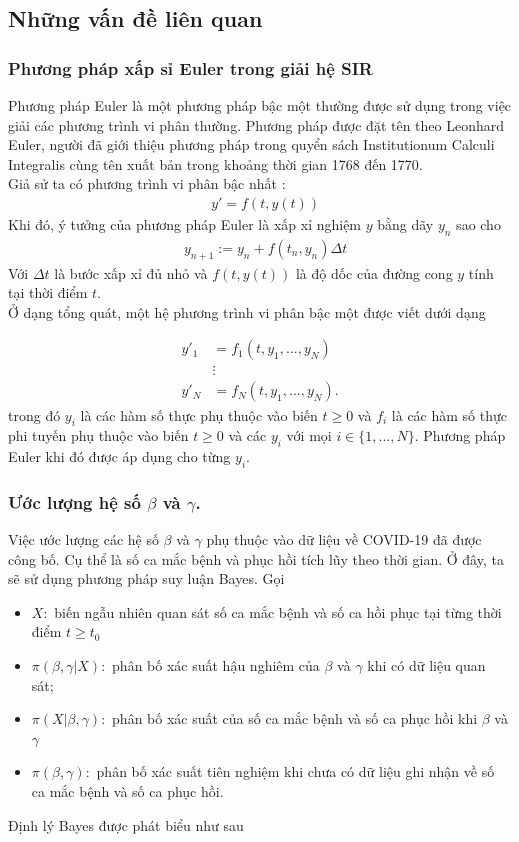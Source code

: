 \documentclass[a4paper]{article}
\begin{document}
\subsection{Những vấn đề liên quan}
	\subsubsection{Phương pháp xấp sỉ Euler trong giải hệ SIR}
Phương pháp Euler là một phương pháp bậc một thường được sử dụng trong việc giải các
phương trình vi phân thường. Phương pháp được đặt tên theo Leonhard Euler, người đã giới
thiệu phương pháp trong quyển sách Institutionum Calculi Integralis cùng tên xuất bản trong
khoảng thời gian 1768 đến 1770. \\
	\qquad  Giả sử ta có phương trình vi phân bậc nhất : 
	\begin{align}
	\label{eqn:5}
	&y' = f(t, y(t)) 
	\end{align}
	Khi đó, ý tưởng của phương pháp Euler là xấp xỉ nghiệm $y$ bằng dãy ${y_n}$ sao cho
	\begin{align}
	&y_{n+1} := y_n + f(t_n, y_n)\Delta t
	\end{align}
Với $\Delta t$ là bước xấp xỉ đủ nhỏ và $f(t, y(t))$ là độ dốc của đường cong $y$ tính tại thời điểm $t$. \\
	\qquad Ở dạng tổng quát, một hệ phương trình vi phân bậc một được viết dưới dạng

	\begin{align}
	y'_1 &= f_1(t,y_1,...,y_N) \\
		& \vdots \\
	y'_N &= f_N(t,y_1,...,y_N).	
	\end{align}
trong đó $y_i$ là các hàm số thực phụ thuộc vào biến $t \geq 0$ và $f_i$ là các hàm số thực phi tuyến 
phụ thuộc vào biến $t \geq 0$ và các $y_i$ với mọi $i \in \{1, . . . , N\}$. Phương pháp Euler khi đó được áp dụng
cho từng $y_i$.
	\subsubsection{Ước lượng hệ số $\beta$ và $\gamma$.}

Việc ước lượng các hệ số $\beta$ và $\gamma$  phụ thuộc vào dữ liệu về COVID-19 đã được công bố. 
Cụ thể là số ca mắc bệnh và phục hồi tích lũy theo thời gian. Ở đây, ta sẽ sử dụng phương pháp suy
luận Bayes. Gọi
	
	\begin{itemize}
	\item $X:$ biến ngẫu nhiên quan sát số ca mắc bệnh và số ca hồi phục tại từng thời điểm $t \geq t_0$
	\item $\pi (\beta, \gamma | X):$ phân bố xác suất hậu nghiêm của $\beta$ và $\gamma$ khi có dữ liệu quan sát;
	\item $\pi(X| \beta, \gamma):$ phân bố xác suất của số ca mắc bệnh và số ca phục hồi khi $\beta$ và $\gamma$ 
	\item $\pi(\beta, \gamma):$ phân bố xác suất tiên nghiệm khi chưa có dữ liệu ghi nhận về số ca mắc bệnh và số
ca phục hồi.
	\end{itemize}
Định lý Bayes được phát biểu như sau
\end{document}
